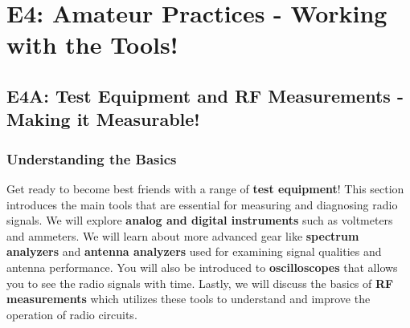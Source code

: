 
\chapter{E4: Amateur Practices - Working with the Tools!}
\section{E4A: Test Equipment and RF Measurements - Making it Measurable!}

\subsection*{Understanding the Basics}
Get ready to become best friends with a range of \textcolor{myblue}{\textbf{test equipment}}! This section introduces the main tools that are essential for measuring and diagnosing radio signals. We will explore \textcolor{myblue}{\textbf{analog and digital instruments}} such as voltmeters and ammeters. We will learn about more advanced gear like \textcolor{myblue}{\textbf{spectrum analyzers}} and \textcolor{myblue}{\textbf{antenna analyzers}} used for examining signal qualities and antenna performance. You will also be introduced to \textcolor{myblue}{\textbf{oscilloscopes}} that allows you to see the radio signals with time. Lastly, we will discuss the basics of \textcolor{myblue}{\textbf{RF measurements}} which utilizes these tools to understand and improve the operation of radio circuits.
